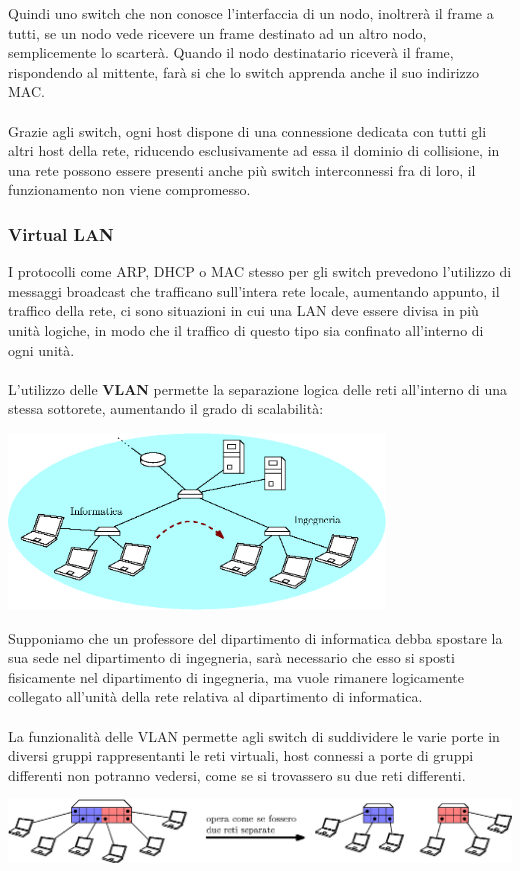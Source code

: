 \documentclass[12pt, letterpaper]{article}
\newcommand{\acc}{\\\hphantom{}\\}
\begin{document}
Quindi uno switch che non conosce l'interfaccia di un nodo, inoltrerà il frame a tutti, se un nodo 
vede ricevere un frame destinato ad un altro nodo, semplicemente lo scarterà. Quando il nodo destinatario riceverà 
il frame, rispondendo al mittente, farà si che lo switch apprenda anche il suo indirizzo MAC.\acc 
Grazie agli switch, ogni host dispone di una connessione dedicata con tutti gli altri host della rete, riducendo 
esclusivamente ad essa il dominio di collisione, in una rete possono essere presenti anche più switch interconnessi 
fra di loro, il funzionamento non viene compromesso.
\subsubsection{Virtual LAN}
I protocolli come ARP, DHCP o MAC stesso per gli switch prevedono l'utilizzo di messaggi broadcast che trafficano 
sull'intera rete locale, aumentando appunto, il traffico della rete, ci sono situazioni in cui una LAN deve essere divisa 
in più unità logiche, in modo che il traffico di questo tipo sia confinato all'interno di ogni unità.\acc 
L'utilizzo delle \textbf{VLAN} permette la separazione logica delle reti all'interno di una stessa sottorete, aumentando 
il grado di scalabilità:\begin{center}
    \includegraphics[width=0.75\textwidth ]{images/InfToEng.eps}
\end{center}
Supponiamo che un professore del dipartimento di informatica debba spostare la sua sede nel dipartimento di ingegneria, 
sarà necessario che esso si sposti fisicamente nel dipartimento di ingegneria, ma vuole rimanere logicamente collegato 
all'unità della rete relativa al dipartimento di informatica.\acc 
La funzionalità delle VLAN permette agli switch di suddividere le varie porte in diversi gruppi rappresentanti 
le reti virtuali, host connessi a porte di gruppi differenti non potranno vedersi, come se si trovassero su due 
reti differenti.\begin{center}
    \includegraphics[width=\textwidth ]{images/VLANPort.eps}
\end{center}
\end{document}
